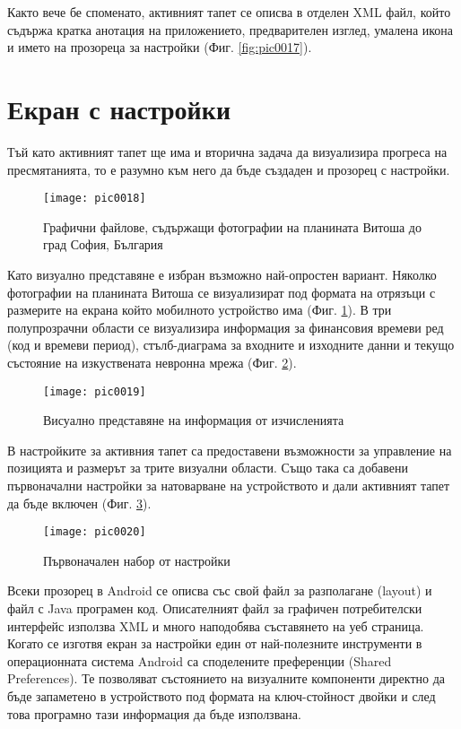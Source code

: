 Както вече бе споменато, активният тапет се описва в отделен XML файл, който съдържа кратка анотация на приложението, предварителен изглед, умалена икона и името на прозореца за настройки (Фиг. \ref{fig:pic0017}). 

\section{Екран с настройки}

Тъй като активният тапет ще има и вторична задача да визуализира прогреса на пресмятанията, то е разумно към него да бъде създаден и прозорец с настройки. 

\begin{figure}[h]
  \centering
  \texttt{[image: pic0018]}
  \caption{Графични файлове, съдържащи фотографии на планината Витоша до град София, България}
\label{fig:pic0018}
\end{figure}
\FloatBarrier

Като визуално представяне е избран възможно най-опростен вариант. Няколко фотографии на планината Витоша се визуализират под формата на отрязъци с размерите на екрана който мобилното устройство има (Фиг. \ref{fig:pic0018}). В три полупрозрачни области се визуализира информация за финансовия времеви ред (код и времеви период), стълб-диаграма за входните и изходните данни и текущо състояние на изкуствената невронна мрежа (Фиг. \ref{fig:pic0019}). 

\begin{figure}[h]
  \centering
  \texttt{[image: pic0019]}
  \caption{Висуално представяне на информация от изчисленията}
\label{fig:pic0019}
\end{figure}
\FloatBarrier

В настройките за активния тапет са предоставени възможности за управление на позицията и размерът за трите визуални области. Също така са добавени първоначални настройки за натоварване на устройството и дали активният тапет да бъде включен (Фиг. \ref{fig:pic0020}). 

\begin{figure}[h]
  \centering
  \texttt{[image: pic0020]}
  \caption{Първоначален набор от настройки}
\label{fig:pic0020}
\end{figure}
\FloatBarrier

Всеки прозорец в Android се описва със свой файл за разполагане (layout) и файл с Java програмен код. Описателният файл за графичен потребителски интерфейс използва XML и много наподобява съставянето на уеб страница. Когато се изготвя екран за настройки един от най-полезните инструменти в операционната система Android са споделените преференции (Shared Preferences). Те позволяват състоянието на визуалните компоненти директно да бъде запаметено в устройството под формата на ключ-стойност двойки и след това програмно тази информация да бъде използвана. 

